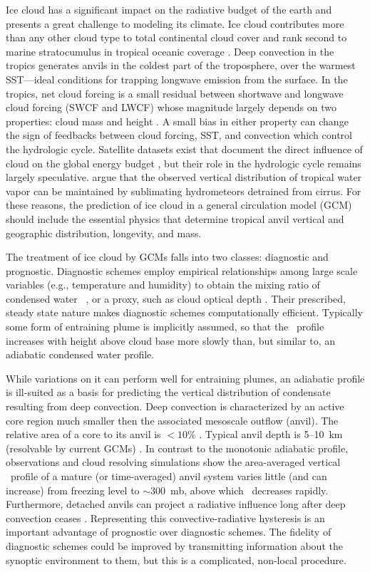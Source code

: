 \documentclass[twoside,agums]{aguplus}
\begin{document}
Ice cloud has a significant impact on the radiative budget of the
earth and presents a great challenge to modeling its climate.
Ice cloud contributes more than any other cloud type to total
continental cloud cover and rank second to marine stratocumulus in
tropical oceanic coverage \cite[]{WHL86,WHL88}.
Deep convection in the tropics generates anvils in the coldest part of
the troposphere, over the warmest SST---ideal conditions for trapping
longwave emission from the surface.
In the tropics, net cloud forcing is a small residual between
shortwave and longwave cloud forcing (SWCF and LWCF) whose magnitude
largely depends on two properties: cloud mass and height
\cite[]{Kie941}. 
A small bias in either property can change the sign of feedbacks
between cloud forcing, SST, and convection which control the
hydrologic cycle. 
Satellite datasets exist that document the direct influence of cloud
on the global energy budget \cite[e.g.,][]{RCH89}, but their role in
the hydrologic cycle remains largely speculative.
\cite{SuL931} argue that the observed vertical distribution of tropical
water vapor can be maintained by sublimating hydrometeors detrained
from cirrus. 
For these reasons, the prediction of ice cloud in a general
circulation model (GCM) should include the essential physics that
determine tropical anvil vertical and geographic distribution,
longevity, and mass.

The treatment of ice cloud by GCMs falls into two classes: diagnostic
and prognostic. 
Diagnostic schemes employ empirical relationships among large scale
variables (e.g., temperature and humidity) to obtain the mixing ratio
of condensed water \qc\ \cite[e.g.,][]{KBB96}, or a proxy, such as cloud
optical depth \cite[]{HRR83}. 
Their prescribed, steady state nature makes diagnostic schemes 
computationally efficient.
Typically some form of entraining plume is implicitly assumed,
so that the \qc\ profile increases with height above cloud base more 
slowly than, but similar to, an adiabatic condensed water profile.

While variations on it can perform well for entraining plumes, an
adiabatic profile is ill-suited as a basis for predicting the vertical
distribution of condensate resulting from deep convection.
Deep convection is characterized by an active core region much smaller
then the associated mesoscale outflow (anvil).
The relative area of a core to its anvil is $< 10\%$ \cite[]{FDR90}.
Typical anvil depth is 5--10~km (resolvable by current GCMs)
\cite[]{WSS931}. 
In contrast to the monotonic adiabatic profile, observations and cloud
resolving simulations \cite[]{WSS932,SLT94,GMK95} show the
area-averaged vertical \qc\ profile of a mature (or time-averaged)
anvil system varies little (and can increase) from freezing level to
$\sim 300$~mb, above which \qc\ decreases rapidly.
Furthermore, detached anvils can project a radiative influence long
after deep convection ceases \cite[]{ALV88}.
Representing this convective-radiative hysteresis is an important
advantage of prognostic over diagnostic schemes.
The fidelity of diagnostic schemes could be improved by
transmitting information about the synoptic environment to them, but
this is a complicated, non-local procedure.
\end{document}
